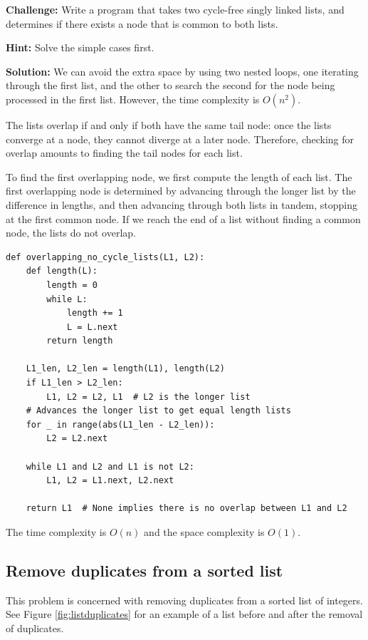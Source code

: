 \documentclass[11pt,a4paper]{article}
\begin{document}
\textbf{Challenge:} Write a program that takes two cycle-free singly linked
lists, and determines if there exists a node that is common to both lists.

\textbf{Hint:} Solve the simple cases first.

\textbf{Solution:} We can avoid the extra space by using two nested loops, one
iterating through the first list, and the other to search the second for the
node being processed in the first list. However, the time complexity is
$O(n^2)$.

The lists overlap if and only if both have the same tail node: once the lists
converge at a node, they cannot diverge at a later node. Therefore, checking
for overlap amounts to finding the tail nodes for each list.

To find the first overlapping node, we first compute the length of each list.
The first overlapping node is determined by advancing through the longer list
by the difference in lengths, and then advancing through both lists in tandem,
stopping at the first common node. If we reach the end of a list without
finding a common node, the lists do not overlap.

\begin{verbatim}
def overlapping_no_cycle_lists(L1, L2):
    def length(L):
        length = 0 
        while L:
            length += 1
            L = L.next 
        return length

    L1_len, L2_len = length(L1), length(L2) 
    if L1_len > L2_len:
        L1, L2 = L2, L1  # L2 is the longer list
    # Advances the longer list to get equal length lists 
    for _ in range(abs(L1_len - L2_len)):
        L2 = L2.next

    while L1 and L2 and L1 is not L2: 
        L1, L2 = L1.next, L2.next

    return L1  # None implies there is no overlap between L1 and L2
\end{verbatim}

The time complexity is $O(n)$ and the space complexity is $O(1)$.

\subsection{Remove duplicates from a sorted list}

This problem is concerned with removing duplicates from a sorted list of
integers. See Figure \ref{fig:listduplicates} for an example of a list before
and after the removal of duplicates.
\end{document}
